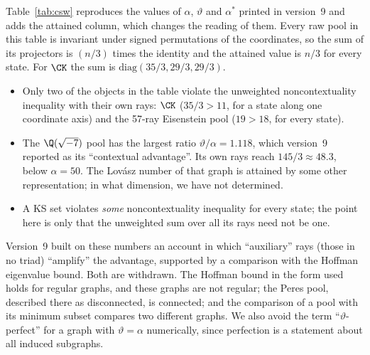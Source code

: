 Table~\ref{tab:csw} reproduces the values of $\alpha$, $\vartheta$ and $\alpha^{*}$ printed in
version~9 and adds the attained column, which changes the reading of them.  Every raw pool in this table is
invariant under signed permutations of the coordinates, so the sum of its projectors is
$(n/3)$ times the identity and the attained value is $n/3$ for every state.  For $\CK$ the sum is
$\mathrm{diag}(35/3,29/3,29/3)$.

\begin{itemize}
\item Only two of the objects in the table violate the unweighted noncontextuality inequality with
their own rays: $\CK$ ($35/3>11$, for a state along one coordinate axis) and the 57-ray Eisenstein pool
($19>18$, for every state).
\item The $\Q(\sqrt{-7})$ pool has the largest ratio $\vartheta/\alpha=1.118$, which version~9
reported as its ``contextual advantage''.  Its own rays reach $145/3\approx48.3$, below
$\alpha=50$.  The Lov\'asz number of that graph is attained by some other representation; in
what dimension, we have not determined.
\item A KS set violates \emph{some} noncontextuality inequality for every state; the point here
is only that the unweighted sum over all its rays need not be one.
\end{itemize}

Version~9 built on these numbers an account in which ``auxiliary'' rays (those in no triad)
``amplify'' the advantage, supported by a comparison with the Hoffman eigenvalue bound.  Both are
withdrawn.  The Hoffman bound in the form used holds for regular graphs, and these graphs are not
regular; the Peres pool, described there as disconnected, is connected; and the comparison of a
pool with its minimum subset compares two different graphs.  We also avoid the term
``$\vartheta$-perfect'' for a graph with $\vartheta=\alpha$ numerically, since perfection is a
statement about all induced subgraphs.
